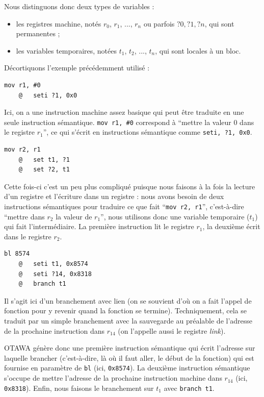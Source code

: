 \documentclass[french]{article}
\begin{document}
  Nous distinguons donc deux types de variables :
  
  \begin{itemize}
    \item les registres machine, notés $r_0$, $r_1$, ..., $r_n$ ou parfois $?0, ?1, ?n$, qui sont permanentes ;
    \item les variables temporaires, notées $t_1$, $t_2$, ..., $t_n$, qui sont locales à un bloc.
  \end{itemize}
  
  Décortiquons l'exemple précédemment utilisé :
  
  \begin{lstlisting}[language={[ARM]Assembler}]
    mov r1, #0
    @	seti ?1, 0x0
  \end{lstlisting}
  
  Ici, on a une instruction machine assez basique qui peut être traduite en une seule instruction sémantique. \texttt{mov r1, \#0} correspond à ``mettre la valeur 0 dans le registre $r_1$'', ce qui s'écrit en instructions sémantique comme \texttt{seti, ?1, 0x0}.

  \begin{lstlisting}[language={[ARM]Assembler}]
    mov r2, r1
    @	set t1, ?1
    @	set ?2, t1
  \end{lstlisting}
  
  Cette fois-ci c'est un peu plus compliqué puisque nous faisons à la fois la lecture d'un registre et l'écriture dans un registre : nous avons besoin de deux instructions sémantiques pour traduire ce que fait ``\texttt{mov r2, r1}'', c'est-à-dire ``mettre dans $r_2$ la valeur de $r_1$'', nous utilisons donc une variable temporaire ($t_1$) qui fait l'intermédiaire. La première instruction lit le registre $r_1$, la deuxième écrit dans le registre $r_2$.

  \begin{lstlisting}[language={[ARM]Assembler}]
    bl 8574
    @	seti t1, 0x8574
    @	seti ?14, 0x8318
    @	branch t1
  \end{lstlisting}

  Il s'agit ici d'un branchement avec lien (on se souvient d'où on a fait l'appel de fonction pour y revenir quand la fonction se termine). Techniquement, cela se traduit par un simple branchement avec la sauvegarde au préalable de l'adresse de la prochaine instruction dans $r_{14}$ (on l'appelle aussi le registre \textit{link}).
  
  OTAWA génère donc une première instruction sémantique qui écrit l'adresse sur laquelle brancher (c'est-à-dire, là où il faut aller, le début de la fonction) qui est fournise en paramètre de \texttt{bl} (ici, \texttt{0x8574}). La deuxième instruction sémantique s'occupe de mettre l'adresse de la prochaine instruction machine dans $r_14$ (ici, \texttt{0x8318}). Enfin, nous faisons le branchement sur $t_1$ avec \texttt{branch t1}.
  
\end{document}
